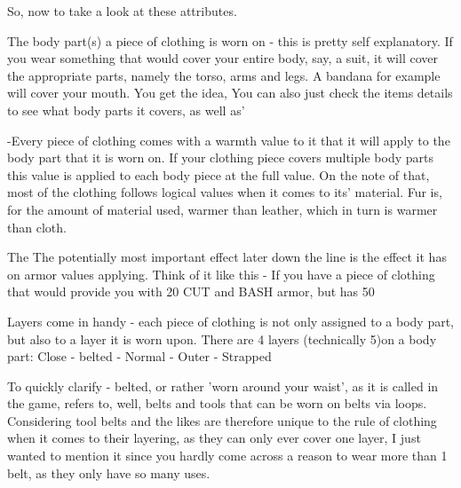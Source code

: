 \documentclass[11pt]{report}
\begin{document}
So, now to take a look at these attributes.

The body part(s) a piece of clothing is worn on - this is pretty self explanatory. If you wear something that would cover your entire body, say, a suit, it will cover the appropriate parts, namely the torso, arms and legs. A bandana for example will cover your mouth. You get the idea, You can also just check the items details to see what body parts it covers, as well as'

-Every piece of clothing comes with a warmth value to it that it will apply to the body part that it is worn on. If your clothing piece covers multiple body parts this value is applied to each body piece at the full value. On the note of that, most of the clothing follows logical values when it comes to its' material. Fur is, for the amount of material used, warmer than leather, which in turn is warmer than cloth.

The %
The potentially most important effect later down the line is the effect it has on armor values applying. Think of it like this - If you have a piece of clothing that would provide you with 20 CUT and BASH armor, but has 50%

Layers come in handy - each piece of clothing is not only assigned to a body part, but also to a layer it is worn upon.
There are 4 layers (technically 5)on a body part: Close - belted - Normal - Outer - Strapped

To quickly clarify - belted, or rather 'worn around your waist', as it is called in the game, refers to, well, belts and tools that can be worn on belts via loops. Considering tool belts and the likes are therefore unique to the rule of clothing when it comes to their layering, as they can only ever cover one layer, I just wanted to mention it since you hardly come across a reason to wear more than 1 belt, as they only have so many uses.
\end{document}
